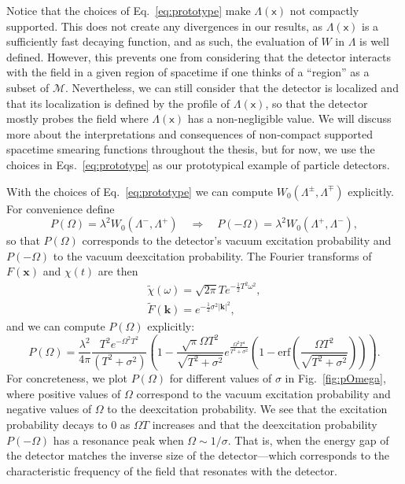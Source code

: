 \documentclass[letterpaper,12pt,titlepage,oneside,final]{book}
\newcommand{\M}{\mathcal{M}}
\newcommand{\mf}{\mathsf}%
\begin{document}
Notice that the choices of Eq.~\eqref{eq:prototype} make $\Lambda(\mf x)$ not compactly supported. This does not create any divergences in our results, as $\Lambda(\mf x)$ is a sufficiently fast decaying function, and as such, the evaluation of $W$ in $\Lambda$ is well defined. However, this prevents one from considering that the detector interacts with the field in a given region of spacetime if one thinks of a ``region'' as a subset of $\M$. Nevertheless, we can still consider that the detector is localized and that its localization is defined by the profile of $\Lambda(\mf x)$, so that the detector mostly probes the field where $\Lambda(\mf x)$ has a non-negligible value. We will discuss more about the interpretations and consequences of non-compact supported spacetime smearing functions throughout the thesis, but for now, we use the choices in Eqs.~\eqref{eq:prototype} as our prototypical example of particle detectors. 

With the choices of Eq.~\eqref{eq:prototype} we can compute $W_0(\Lambda^\pm,\Lambda^\mp)$ explicitly. For convenience define
\begin{equation}
    P(\Omega) = \lambda^2 W_0(\Lambda^-,\Lambda^+) \quad\Rightarrow \quad P(-\Omega) = \lambda^2 W_0(\Lambda^+,\Lambda^-),
\end{equation}
so that $P(\Omega)$ corresponds to the detector's vacuum excitation probability and $P(-\Omega)$ to the vacuum deexcitation probability. The Fourier transforms of $F(\bm x)$ and $\chi(t)$ are then
\begin{align}
    \tilde{\chi}(\omega) = \sqrt{2\pi} T e^{- \frac{1}{2}T^2 \omega^2},\\
    \tilde{F}(\bm k) = e^{- \frac{1}{2} \sigma^2 |\bm k|^2},
\end{align}
and we can compute $P(\Omega)$ explicitly:
\begin{equation}\label{eq:POmegaproto}
    P(\Omega) = \frac{\lambda^2}{4\pi} \frac{T^2 e^{- \Omega^2 T^2}}{(T^2 + \sigma^2)}\left(1 - \frac{\sqrt{\pi}\Omega T^2}{\sqrt{T^2 + \sigma^2}}e^{\frac{\Omega^2T^4}{T^2 + \sigma^2}}\left(1-\text{erf}\left(\frac{\Omega T^2}{\sqrt{T^2 + \sigma^2}}\right)\right)\right).
\end{equation}
For concreteness, we plot $P(\Omega)$ for different values of $\sigma$ in Fig.~\ref{fig:pOmega}, where positive values of $\Omega$ correspond to the vacuum excitation probability and negative values of $\Omega$ to the deexcitation probability. We see that the excitation probability decays to $0$ as $\Omega T$ increases and that the deexcitation probability $P(-\Omega)$ has a resonance peak when $\Omega \sim 1/\sigma$. That is, when the energy gap of the detector matches the inverse size of the detector---which corresponds to the characteristic frequency of the field that resonates with the detector.
\end{document}
